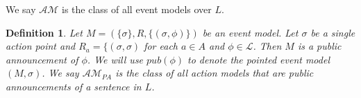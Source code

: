 \documentclass[12pt, a4paper, titlepage]{scrartcl}
\newtheorem{defn}{Definition}
\newtheorem{lemma}{Lemma}
\begin{document}
%
%
%
We say $\mathcal{AM}$ is the class of all event models over $L$.
\begin{defn} \label{pub}
Let $M = (\{ \sigma \}, R, \{ (\sigma, \phi)\})$ be an event model.
Let $\sigma$ be a single action point and $R_a = \{(\sigma, \sigma)$ for each $a \in A$ and $\phi
\in \mathcal{L}$.
Then $M$ is a public announcement of $\phi$.
We will use $pub(\phi)$ to denote the pointed event model $(M, \sigma)$.
We say $\mathcal{AM}_{PA}$ is the class of all action models that
are public announcements of a sentence in $L$.
\end{defn}
\end{document}
